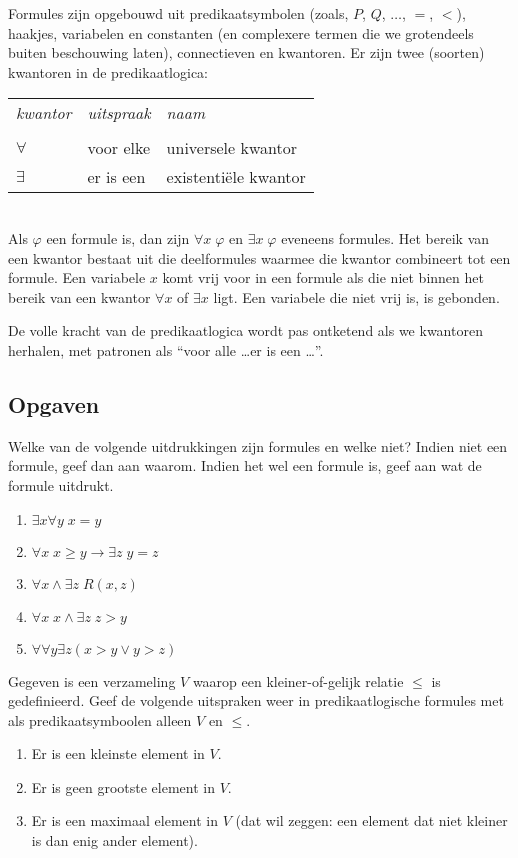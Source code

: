 Formules zijn opgebouwd uit predikaatsymbolen (zoals, $P$, $Q$, $\ldots$, $=$, $<$), haakjes, variabelen en constanten (en complexere termen die we grotendeels buiten beschouwing laten), connectieven en kwantoren. Er zijn twee (soorten) kwantoren in de predikaatlogica:\\[5pt]
\begin{tabular}{p{2cm}p{3cm}p{4cm}}
\cmidrule(r){1-1}\cmidrule(rl){2-2}\cmidrule(l){3-3}
\textit{kwantor} & \textit{uitspraak} & \textit{naam}\\
\\
$\forall$ & voor elke & universele kwantor\\
$\exists$ & er is een & existenti\"ele kwantor\\
\cmidrule(r){1-1}\cmidrule(rl){2-2}\cmidrule(l){3-3}
\end{tabular}\\[5pt]
Als $\varphi$ een formule is, dan zijn $\forall x\;\varphi$ en $\exists x\;\varphi$ eveneens formules. Het bereik van een kwantor bestaat uit die deelformules waarmee die kwantor combineert tot een formule. Een variabele $x$ komt vrij voor in een formule als die niet binnen het bereik van een kwantor $\forall x$ of $\exists x$ ligt. Een variabele die niet vrij is, is gebonden.

De volle kracht van de predikaatlogica wordt pas ontketend als we kwantoren herhalen, met patronen als ``voor alle \ldots er is een \ldots''.

\subsection{Opgaven}
\begin{exercise}
Welke van de volgende uitdrukkingen zijn formules en welke niet? Indien niet een formule, geef dan aan waarom. Indien het wel een formule is, geef aan wat de formule uitdrukt.
\begin{enumerate}[label=\roman*.]
\item $\exists x\forall y\;x=y$
\item $\forall x\;x\geq y\rightarrow\exists z\; y=z$
\item $\forall x\wedge\exists z\;R(x,z)$
\item $\forall x\;x\wedge\exists z\;z>y$
\item $\forall \forall y\exists z(x>y\vee y>z)$
\end{enumerate}
\end{exercise}

\begin{exercise}
Gegeven is een verzameling $V$ waarop een kleiner-of-gelijk relatie $\leq$ is gedefinieerd. Geef de volgende uitspraken weer in predikaatlogische formules met als predikaatsymboolen alleen $V$ en $\leq$.
\begin{enumerate}[label=\roman*.]
\item Er is een kleinste element in $V$.
\item Er is geen grootste element in $V$.
\item Er is een maximaal element in $V$ (dat wil zeggen: een element dat niet kleiner is dan enig ander element).
\end{enumerate}
\end{exercise}

